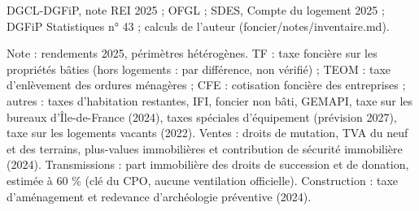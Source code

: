 DGCL-DGFiP, note REI 2025 ; OFGL ; SDES, Compte du logement 2025 ; DGFiP Statistiques n° 43 ; calculs de l'auteur (foncier/notes/inventaire.md).\par Note : rendements 2025, périmètres hétérogènes. TF : taxe foncière sur les propriétés bâties (hors logements : par différence, non vérifié) ; TEOM : taxe d'enlèvement des ordures ménagères ; CFE : cotisation foncière des entreprises ; autres : taxes d'habitation restantes, IFI, foncier non bâti, GEMAPI, taxe sur les bureaux d'Île-de-France (2024), taxes spéciales d'équipement (prévision 2027), taxe sur les logements vacants (2022). Ventes : droits de mutation, TVA du neuf et des terrains, plus-values immobilières et contribution de sécurité immobilière (2024). Transmissions : part immobilière des droits de succession et de donation, estimée à 60 \% (clé du CPO, aucune ventilation officielle). Construction : taxe d'aménagement et redevance d'archéologie préventive (2024).
